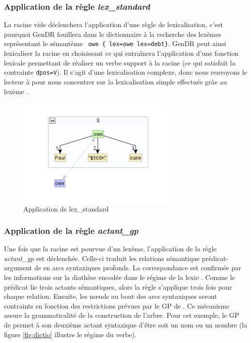 \subsubsection{Application de la règle \emph{lex\_standard}}
La racine vide déclenchera l'application d'une règle de lexicalisation, c'est pourquoi GenDR fouillera dans le dictionnaire à la recherche des lexèmes représentant le sémantème  \lstinline! owe { lex=owe lex=debt}!. GenDR peut ainsi lexicaliser la racine en choisissant  ce qui entraînera l'application d'une fonction lexicale permettant de réaliser un verbe support à la racine (ce qui satisfait la contrainte \texttt{dpos=V}). Il s'agit d'une lexicalisation complexe, donc nous renvoyons le lecteur à \cite{lambrey15,LambreyImplementationcollocationspour2017,lareau18} pour nous concentrer sur la lexicalisation simple effectuée grâe au lexème .

\begin{figure}[htb]
	\centering
	\includegraphics[width=0.7\textwidth, trim = {0cm 0.7cm 0cm 0.9cm},clip]{ch3/figs/lex_standard_root.png}
		\vspace{-0.5cm}
	\caption{Application de lex\_standard}
	\label{fig:lexstand1}
\end{figure}

\subsubsection{Application de la règle \emph{actant\_gp}}
Une fois que la racine est pourvue d'un lexème, l'application de la règle \emph{actant\_gp} est déclenchée. Celle-ci traduit les relations sémantique prédicat-argument de  en arcs syntaxiques profonds. La correspondance est confirmée par les informations sur la diathèse encodée dans le régime de la lexie . Comme le prédicat lie trois actants sémantiques, alors la règle s'applique trois fois pour chaque relation. Ensuite, les n\oe{}uds au bout des arcs syntaxiques seront contraints en fonction des restrictions prévues par le \ac{GP} de . Ce mécanisme assure la grammaticalité de la construction de l'arbre. Pour cet exemple, le \ac{GP} de  permet à son deuxième actant syntaxique d'être soit un nom ou un nombre (la figure \ref{fig:dictio} illustre le régime du verbe).

